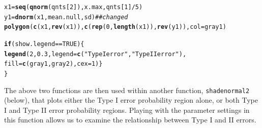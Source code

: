 \documentclass[12pt]{book}\usepackage[]{graphicx}\usepackage[]{color}
\makeatletter
\newcommand{\hlnum}[1]{\textcolor[rgb]{0.686,0.059,0.569}{#1}}%
\newcommand{\hlstr}[1]{\textcolor[rgb]{0.192,0.494,0.8}{#1}}%
\newcommand{\hlcom}[1]{\textcolor[rgb]{0.678,0.584,0.686}{\textit{#1}}}%
\newcommand{\hlopt}[1]{\textcolor[rgb]{0,0,0}{#1}}%
\newcommand{\hlstd}[1]{\textcolor[rgb]{0.345,0.345,0.345}{#1}}%
\newcommand{\hlkwa}[1]{\textcolor[rgb]{0.161,0.373,0.58}{\textbf{#1}}}%
\newcommand{\hlkwb}[1]{\textcolor[rgb]{0.69,0.353,0.396}{#1}}%
\newcommand{\hlkwc}[1]{\textcolor[rgb]{0.333,0.667,0.333}{#1}}%
\newcommand{\hlkwd}[1]{\textcolor[rgb]{0.737,0.353,0.396}{\textbf{#1}}}%
\newenvironment{kframe}{%
 \def\at@end@of@kframe{}%
 \ifinner\ifhmode%
  \def\at@end@of@kframe{\end{minipage}}%
  \begin{minipage}{\columnwidth}%
 \fi\fi%
 \def\FrameCommand##1{\hskip\@totalleftmargin \hskip-\fboxsep
 \colorbox{shadecolor}{##1}\hskip-\fboxsep
     \hskip-\linewidth \hskip-\@totalleftmargin \hskip\columnwidth}%
 \MakeFramed {\advance\hsize-\width
   \@totalleftmargin\z@ \linewidth\hsize
   \@setminipage}}%
 {\par\unskip\endMakeFramed%
 \at@end@of@kframe}
\newenvironment{knitrout}{}{} %
\makeatother
\begin{document}
\begin{knitrout}
\begin{kframe}
\begin{alltt}
    \hlstd{x1} \hlkwb{=} \hlkwd{seq}\hlstd{(}\hlkwd{qnorm}\hlstd{(qnts[}\hlnum{2}\hlstd{]), x.max, qnts[}\hlnum{1}\hlstd{]}\hlopt{/}\hlnum{5}\hlstd{)}
    \hlstd{y1} \hlkwb{=} \hlkwd{dnorm}\hlstd{(x1, mean.null, sd)} \hlcom{## changed}
    \hlkwd{polygon}\hlstd{(}\hlkwd{c}\hlstd{(x1,} \hlkwd{rev}\hlstd{(x1)),} \hlkwd{c}\hlstd{(}\hlkwd{rep}\hlstd{(}\hlnum{0}\hlstd{,} \hlkwd{length}\hlstd{(x1)),} \hlkwd{rev}\hlstd{(y1)),} \hlkwc{col} \hlstd{= gray1)}

\hlkwa{if}\hlstd{(show.legend}\hlopt{==}\hlnum{TRUE}\hlstd{)\{}
    \hlkwd{legend}\hlstd{(}\hlnum{2}\hlstd{,}\hlnum{0.3}\hlstd{,} \hlkwc{legend}\hlstd{=}\hlkwd{c}\hlstd{(}\hlstr{"Type I error"}\hlstd{,}\hlstr{"Type II error"}\hlstd{),}
    \hlkwc{fill}\hlstd{=}\hlkwd{c}\hlstd{(gray1,gray2),}\hlkwc{cex}\hlstd{=}\hlnum{1}\hlstd{)\}}
\hlstd{\}}
\end{alltt}
\end{kframe}
\end{knitrout}

The above two functions are then used within another function,
\texttt{shadenormal2} (below), that plots either the Type I error probability region alone, or both Type I and Type II error probability regions. Playing with the parameter settings in this function allows us to examine the relationship between Type I and II errors.
\end{document}
